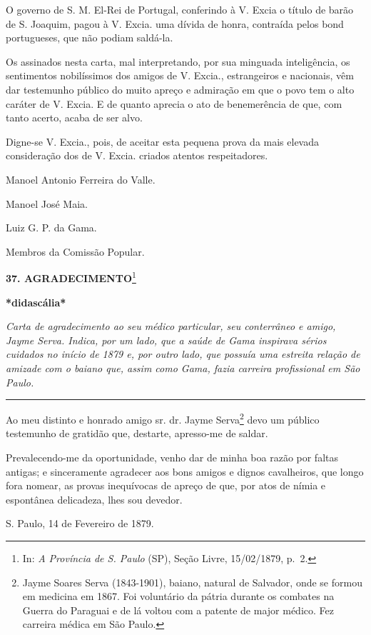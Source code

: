 O governo de S. M. El-Rei de Portugal, conferindo à V. Excia o título de
barão de S. Joaquim, pagou à V. Excia. uma dívida de honra, contraída
pelos bond portugueses, que não podiam saldá-la.

Os assinados nesta carta, mal interpretando, por sua minguada
inteligência, os sentimentos nobilíssimos dos amigos de V. Excia.,
estrangeiros e nacionais, vêm dar testemunho público do muito apreço e
admiração em que o povo tem o alto caráter de V. Excia. E de quanto
aprecia o ato de benemerência de que, com tanto acerto, acaba de ser
alvo.

Digne-se V. Excia., pois, de aceitar esta pequena prova da mais elevada
consideração dos de V. Excia. criados atentos respeitadores.

Manoel Antonio Ferreira do Valle.

Manoel José Maia.

Luiz G. P. da Gama.

Membros da Comissão Popular.

\textbf{37. AGRADECIMENTO}\footnote{In: \emph{A Província de S. Paulo}
  (SP), Seção Livre, 15/02/1879, p.~2.}

\textbf{*didascália*}

\emph{Carta de agradecimento ao seu médico particular, seu conterrâneo e
amigo, Jayme Serva. Indica, por um lado, que a saúde de Gama inspirava
sérios cuidados no início de 1879 e, por outro lado, que possuía uma
estreita relação de amizade com o baiano que, assim como Gama, fazia
carreira profissional em São Paulo.}

\begin{center}\rule{0.5\linewidth}{\linethickness}\end{center}

Ao meu distinto e honrado amigo sr. dr. Jayme Serva\footnote{Jayme
  Soares Serva (1843-1901), baiano, natural de Salvador, onde se formou
  em medicina em 1867. Foi voluntário da pátria durante os combates na
  Guerra do Paraguai e de lá voltou com a patente de major médico. Fez
  carreira médica em São Paulo.} devo um público testemunho de gratidão
que, destarte, apresso-me de saldar.

Prevalecendo-me da oportunidade, venho dar de minha boa razão por faltas
antigas; e sinceramente agradecer aos bons amigos e dignos cavalheiros,
que longo fora nomear, as provas inequívocas de apreço de que, por atos
de nímia e espontânea delicadeza, lhes sou devedor.

S. Paulo, 14 de Fevereiro de 1879.

